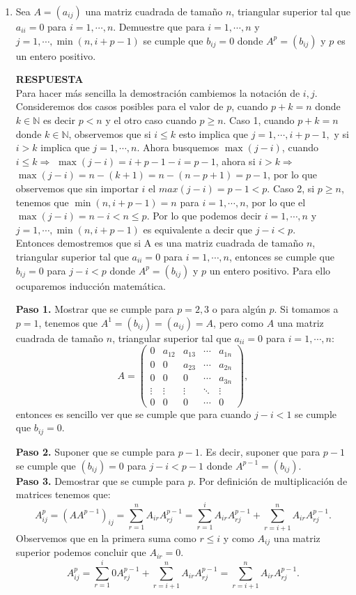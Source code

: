 \documentclass[11pt,letterpaper]{article}
\newcommand{\res}{\textbf{RESPUESTA}\\}
\begin{document}
\begin{enumerate}
\item Sea $A=(a_{ij})$ una matriz cuadrada de tamaño $n$, triangular superior tal que $a_{ii}=0$ para $i=1, \cdots , n.$ Demuestre que para $i=1, \cdots , n$ y $j=1, \cdots , \min (n,i+p-1)$ se cumple que $b_{ij}=0$ donde $A^p=(b_{ij})$ y $p$ es un entero positivo. 

\res
Para hacer más sencilla la demostración cambiemos la notación de $i,j$. Consideremos dos casos posibles para el valor de $p$, cuando $p+k=n$ donde $k\in \mathbb{N}$ es decir $p<n$ y el otro caso cuando $p\geq n$.  Caso 1, cuando $p+k=n$ donde $k\in \mathbb{N}$, observemos que si $i\leq k$ esto implica que $j=1,\cdots, i+p-1,$ y si $i>k$ implica que $j=1,\cdots,n.$ Ahora busquemos $\max (j-i)$, cuando $i\leq k\Rightarrow$ $\max (j-i)=i+p-1-i=p-1$, ahora si $i>k\Rightarrow$ $\max (j-i)=n-(k+1)=n-(n-p+1)=p-1$, por lo que observemos que sin importar $i$ el  $max(j-i)=p-1<p$. Caso 2, si $p\geq n$, tenemos que $\min(n,i+p-1)=n$ para $i=1,\cdots,n$, por lo que el $\max(j-i)=n-i< n\leq p$. Por lo que podemos decir $i=1, \cdots , n$ y $j=1, \cdots , \min (n,i+p-1)$ es equivalente a decir que $j-i<p.$\\
Entonces demostremos que si A es una matriz cuadrada de tamaño $n$, triangular superior tal que $a_{ii}=0$ para $i=1,\cdots, n$, entonces se cumple que $b_{ij}=0$ para $j-i<p$ donde $A^p=(b_{ij})$ y $p$ un entero positivo. Para ello ocuparemos inducción matemática. 

\textbf{Paso 1.} Mostrar que se cumple para $p=2,3$ o para algún $p$. Si tomamos a $p=1$, tenemos que $A^1=(b_{ij})=(a_{ij})=A$, pero como $A$ una matriz cuadrada de tamaño $n$, triangular superior tal que $a_{ii}=0$ para $i=1, \cdots , n$:
\begin{equation*}
A=\left( \begin{array}{ccccc}
0& a_{12} & a_{13} & \cdots & a_{1n}\\
0 & 0 & a_{23} & \cdots & a_{2n}\\
0 & 0 & 0 & \cdots & a_{3n}\\
\vdots & \vdots & \vdots & \ddots & \vdots\\
0 & 0 & 0 & \cdots & 0
\end{array}\right),
\end{equation*}
entonces es sencillo ver que se cumple que para cuando $j-i<1$ se cumple que $b_{ij}=0$.

\textbf{Paso 2.} Suponer que se cumple para $p-1$. Es decir, suponer que para $p-1$ se cumple que $(b_{ij})=0$ para $j-i<p-1$ donde  $A^{p-1}=(b_{ij})$.\\
\textbf{Paso 3.} Demostrar que se cumple para $p$. Por definición de multiplicación de matrices tenemos que:
$$A_{ij}^p=(AA^{p-1})_{ij}=\sum_{r=1}^nA_{ir}A_{rj}^{p-1}=\sum_{r=1}^iA_{ir}A_{rj}^{p-1}+\sum_{r=i+1}^nA_{ir}A_{rj}^{p-1}.$$
Observemos que en la primera suma como $r\leq i$ y como $A_{ij}$ una matriz superior podemos concluir que $A_{ir}=0$.
$$A_{ij}^p=\sum_{r=1}^i0A_{rj}^{p-1}+\sum_{r=i+1}^nA_{ir}A_{rj}^{p-1}=\sum_{r=i+1}^nA_{ir}A_{rj}^{p-1}.$$


\end{enumerate}
\end{document}
